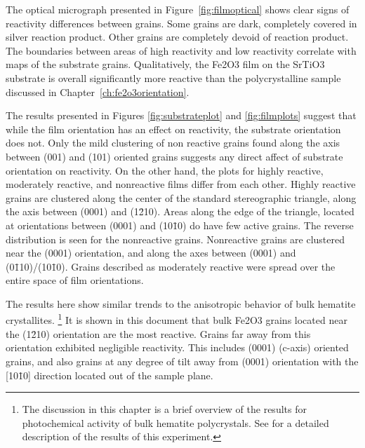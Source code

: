 \documentclass[12pt,%
              twoside,
               letterpaper]{uiothesis}
\begin{document}
The optical micrograph presented in Figure~\ref{fig:filmoptical} shows clear signs of
reactivity differences between grains. Some grains are dark, completely covered in silver
reaction product. Other grains are completely devoid of reaction product. The boundaries
between areas of high reactivity and low reactivity correlate with  maps of the
substrate grains. Qualitatively, the Fe2O3 film on the SrTiO3 substrate is
overall significantly more reactive than the polycrystalline sample discussed in
Chapter~\ref{ch:fe2o3orientation}. 

The results presented in Figures \ref{fig:substrateplot} and \ref{fig:filmplots} suggest
that while the film orientation has an effect on reactivity, the substrate orientation
does not. Only the mild clustering of non reactive grains found along the axis between
(001) and (101) oriented grains suggests any direct affect of substrate orientation on
reactivity. On the other hand, the plots for highly reactive, moderately reactive, and
nonreactive films differ from each other. Highly reactive grains are clustered along the
center of the standard stereographic triangle, along the axis between (0001) and
(1\={2}10). Areas along the edge of the triangle, located at orientations between (0001)
and (10\={1}0) do have few active grains. The reverse distribution is seen for the
nonreactive grains. Nonreactive grains are clustered near the (0001) orientation, and
along the axes between (0001) and (0\={1}10)/(10\={1}0). Grains described as moderately
reactive were spread over the entire space of film orientations. 

The results here show similar trends to the anisotropic behavior of bulk hematite
crystallites.%
\footnote{%
	The discussion in this chapter is a brief overview of the results for photochemical
activity of bulk hematite polycrystals. See  for a
detailed description of the results of this experiment.
} 
It is shown in this document that bulk Fe2O3 grains located near the (1\={2}10)
orientation are the most reactive. Grains far away from this orientation exhibited
negligible reactivity. This includes (0001) (c-axis) oriented grains, and also grains at
any degree of tilt away from (0001) orientation with the [10\={1}0] direction located out
of the sample plane. 
\end{document}
